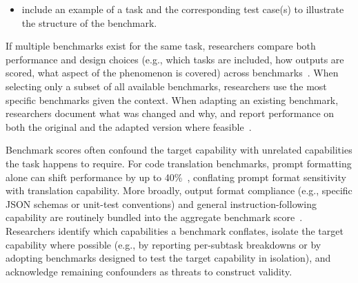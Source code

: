 \begin{itemize}
    \item include an example of a task and the corresponding test case(s) to illustrate the structure of the benchmark.
\end{itemize}

If multiple benchmarks exist for the same task, researchers \should compare both performance and design choices (e.g., which tasks are included, how outputs are scored, what aspect of the phenomenon is covered) across benchmarks~\cite{bean2025measuring}.
When selecting only a subset of all available benchmarks, researchers \should use the most specific benchmarks given the context.
When adapting an existing benchmark, researchers \should document what was changed and why, and \should report performance on both the original and the adapted version where feasible~\cite{bean2025measuring}.

Benchmark scores often confound the target capability with unrelated capabilities the task happens to require. For code translation benchmarks, prompt formatting alone can shift performance by up to 40\%~\cite{DBLP:journals/corr/abs-2411-10541, cao2025should}, conflating prompt format sensitivity with translation capability. More broadly, output format compliance (e.g., specific JSON schemas or unit-test conventions) and general instruction-following capability are routinely bundled into the aggregate benchmark score~\cite{bean2025measuring}. Researchers \should identify which capabilities a benchmark conflates, isolate the target capability where possible (e.g., by reporting per-subtask breakdowns or by adopting benchmarks designed to test the target capability in isolation), and acknowledge remaining confounders as threats to construct validity.

